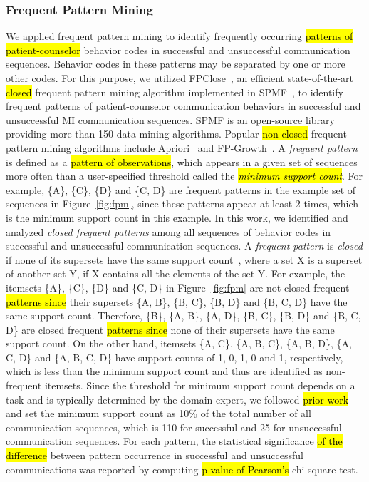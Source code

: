 \documentclass[smallextended]{svjour3}       %
\begin{document}
\subsubsection{Frequent Pattern Mining}
\label{subsubsec:frequentPatternMining}
We applied frequent pattern mining to identify frequently occurring \hl{patterns of patient-counselor} behavior codes in successful and unsuccessful communication sequences. Behavior codes in these patterns may be separated by one or more other codes. For this purpose, we utilized FPClose~\cite{grahne2005fast}, an efficient state-of-the-art \hl{closed} frequent pattern mining algorithm implemented in SPMF~\cite{fournier2014spmf, fournier2016spmf}, to identify frequent patterns of patient-counselor communication behaviors in successful and unsuccessful MI communication sequences. SPMF is an open-source library providing more than 150 data mining algorithms. Popular \hl{non-closed} frequent pattern mining algorithms include Apriori~\cite{agrawal1994fast} and FP-Growth~\cite{han2000mining}. A \textit{frequent pattern} is defined as a \hl{pattern of observations}, which appears in a given set of sequences more often than a user-specified threshold called the \hl{\textit{minimum support count}}. For example, \{A\}, \{C\}, \{D\} and \{C, D\} are frequent patterns in the example set of sequences in Figure~\ref{fig:fpm}, since these patterns appear at least 2 times, which is the minimum support count in this example. In this work, we identified and analyzed \textit{closed frequent patterns} among all sequences of behavior codes in successful and unsuccessful communication sequences. A \textit{frequent pattern} is \textit{closed} if none of its supersets have the same support count~\cite{pasquier1999discovering}, where a set X is a superset of another set Y, if X contains all the elements of the set Y. For example, the itemsets \{A\}, \{C\}, \{D\} and \{C, D\} in Figure~\ref{fig:fpm} are not closed frequent \hl{patterns since} their supersets \{A, B\}, \{B, C\}, \{B, D\} and \{B, C, D\} have the same support count. Therefore, \{B\}, \{A, B\}, \{A, D\}, \{B, C\}, \{B, D\} and \{B, C, D\} are closed frequent \hl{patterns since} none of their supersets have the same support count. On the other hand, itemsets \{A, C\}, \{A, B, C\}, \{A, B, D\}, \{A, C, D\} and \{A, B, C, D\} have support counts of 1, 0, 1, 0 and 1, respectively, which is less than the minimum support count and thus are identified as non-frequent itemsets. Since the threshold for minimum support count depends on a task and is typically determined by the domain expert, we followed \hl{prior work}~\cite{moradi2017quantifying, liu1999mining} and set the minimum support count as 10\% of the total number of all communication sequences, which is 110 for successful and 25 for unsuccessful communication sequences. For each pattern, the statistical significance \hl{of the difference} between pattern occurrence in successful and unsuccessful communications was reported by computing \hl{p-value of Pearson's} chi-square test.  
\end{document}

